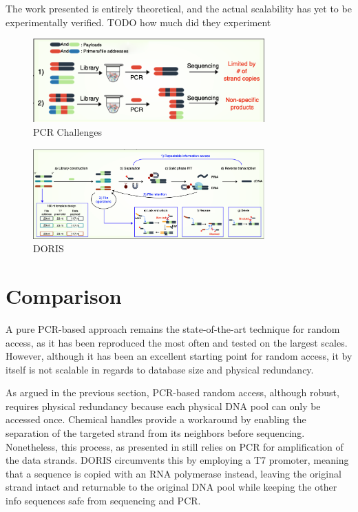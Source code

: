 \documentclass[a4paper,conference]{IEEEtran}
\begin{document}
The work presented is entirely theoretical, and the actual scalability has yet to be experimentally verified. TODO how much did they experiment

\begin{figure}[!t]
\centering
\includegraphics[width=3.5in]{pcrchallenges}
\caption{PCR Challenges}
\label{pcr_challenges}
\end{figure}

\begin{figure}[!t]
\centering
\includegraphics[width=3.5in]{doris}
\caption{DORIS}
\label{doris}
\end{figure}

\section{Comparison}
A pure PCR-based approach remains the state-of-the-art technique for random access, as it has been reproduced the most often and tested on the largest scales. However, although it has been an excellent starting point for random access, it by itself is not scalable in regards to database size and physical redundancy. 

As argued in the previous section, PCR-based random access, although robust, requires physical redundancy because each physical DNA pool can only be accessed once. Chemical handles provide a workaround by enabling the separation of the targeted strand from its neighbors before sequencing. Nonetheless, this process, as presented in \cite{chemicalhandles} still relies on PCR for amplification of the data strands. DORIS circumvents this by employing a T7 promoter, meaning that a sequence is copied with an RNA polymerase instead, leaving the original strand intact and returnable to the original DNA pool while keeping the other info sequences safe from sequencing and PCR.
\end{document}
